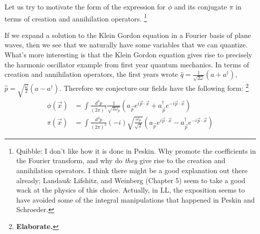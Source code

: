 \documentclass{report}
\theoremstyle{plain}
\theoremstyle{definition}
\theoremstyle{remark}
\newcommand{\FR}[2]{\frac{#1}{#2}}
\newcommand{\SFR}[2]{\sqrt{\frac{#1}{#2}}}
\newcommand{\om}{\omega}
\newcommand{\elaborate}{{\color{blue} \textbf{Elaborate.}}}
\begin{document}
Let us try to motivate the form of the expression for $\phi$ and its
conjugate $\pi$ in terms of creation and annihilation operators.
\footnote{Quibble: I don't like how it is done in Peskin. Why promote the
coefficients in the Fourier transform, and why do \emph{they} give rise to
the creation and annihilation operators. I think there might be a good
explanation out there already; Landau\& Lifshitz, and Weinberg (Chapter 5) seem to take
a good wack at the physics of this choice. Actually, in LL, the exposition
seems to have avoided some of the integral manipulations that happened in
Peskin and Schroeder.}

If we expand a solution to the Klein Gordon equation in a Fourier basis of
plane waves, then we see that we naturally have some variables that we can
quantize. What's more interesting is that the Klein Gordon equation gives
rise to precisely the harmonic oscillator example from first year quantum
mechanics. In terms of creation and annihilation operators, the first years
wrote $\hat q = \FR{1}{\sqrt{2\om}}(a+a^\dag)$, $\hat p =
\SFR{\om}{2}(a-a^\dag)$. Therefore we conjecture our fields have the
following form: \footnote{{\elaborate}}
\newcommand{\vp}{{\vec p}}
\newcommand{\vx}{{\vec x}}
\begin{align*}
\phi(\vx) &= \int \FR{d^3p}{(2\pi)^3} \FR{1}{\sqrt{2\om_p}} (a_\vp e^{i\vp\cdot\vx} + a_\vp^\dag e^{-i\vp\cdot\vx})\\
\pi(\vx) &= \int \FR{d^3p}{(2\pi)^3}(-i)\SFR{\om_p}{\sqrt2} (a_\vp e^{i\vp\cdot\vx} - a_\vp^\dag e^{-i\vp\cdot\vx})
\end{align*}
\end{document}
